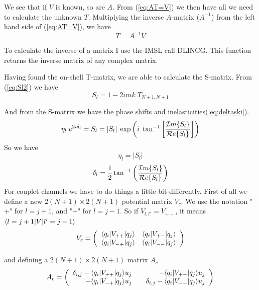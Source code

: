 We see that if $V$ is known, so are $A$. From (\ref{eq:AT=V}) we then have all we need to calculate
the unknown $T$. Multiplying the inverse $A$-matrix ($A^{-1}$) from the left hand side of (\ref{eq:AT=V}), we have
\begin{equation}\label{eq:T=AinvV}
T=A^{-1}V
\end{equation}

To calculate the inverse of a matrix I use the IMSL call DLINCG. This function returns the inverse matrix of any complex matrix.

Having found the on-shell T-matrix, we are able to calculate the S-matrix. From (\ref{eq:Sl2}) we have
\begin{equation}\label{eq:S_lMR}
S_l =1-2imk\; T_{N+1,N+1}
\end{equation}

And from the S-matrix we have the phase shifts and inelasticities(\ref{eq:deltaski}).
\begin{equation}
\eta_l\; e^{2i\delta_l}=S_l=|S_l|\;\exp\bigg(i\;\tan^{-1}\bigg[\frac{{\cal I}m\{S_l\}}{{\cal R}e\{S_l\}}\bigg]\bigg)
\end{equation}
So we have
\begin{equation}
\eta_l=|S_l|
\end{equation}
\begin{equation}
{\delta_l}=\frac{1}{2}\tan^{-1}\bigg(\frac{{\cal I}m\{S_l\}}{{\cal R}e\{S_l\}}\bigg)
\end{equation}
\nl
For couplet channels we have to do things a little bit differently. First of all we define a new
$2(N+1)\times 2(N+1)$ potential matrix $V_c$. We use the notation "$+$" for $l=j+1$, and "$-$" for $l=j-1$.
So if $V_{l,l'}=V_{+-}$, it means $\langle l=j+1|V|l'=j-1\rangle$
\begin{equation}
V_c=
\left( \begin{array}{cc}
\langle q_i|V_{++}|q_j\rangle & \langle q_i|V_{+-}|q_j\rangle\\
\langle q_i|V_{-+}|q_j\rangle & \langle q_i|V_{--}|q_j\rangle
\end{array}\right)
\end{equation}

and defining a $2(N+1)\times 2(N+1)$ matrix $A_c$
\begin{equation} 
A_c=
\left( \begin{array}{rr}
\delta_{i,j}-\langle q_i|V_{++}|q_j\rangle u_j & -\langle q_i|V_{+-}|q_j\rangle u_j \\
-\langle q_i|V_{-+}|q_j\rangle u_j             &\quad \delta_{i,j} -\langle q_i|V_{--}|q_j\rangle u_j
\end{array}\right)
\end{equation}

